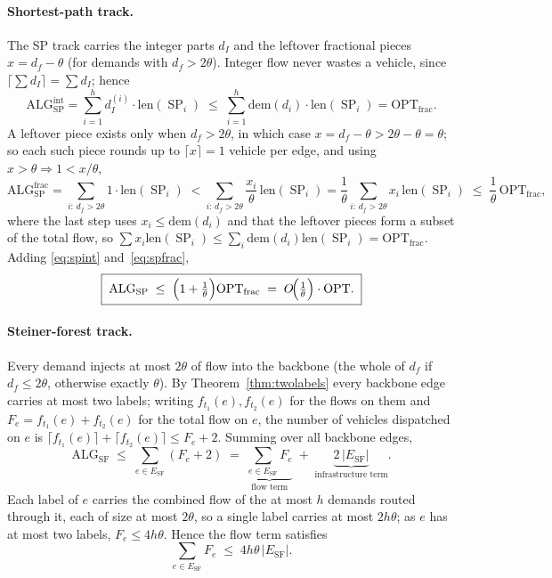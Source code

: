 \documentclass[11pt]{article}
\theoremstyle{definition}
\theoremstyle{remark}
\newcommand{\OPT}{\mathrm{OPT}}
\newcommand{\OPTfrac}{\OPT_{\mathrm{frac}}}
\newcommand{\ALG}{\mathrm{ALG}}
\newcommand{\ALGSP}{\ALG_{\mathrm{SP}}}
\newcommand{\ALGSF}{\ALG_{\mathrm{SF}}}
\newcommand{\ESF}{E_{\mathrm{SF}}}
\newcommand{\dem}{\mathrm{dem}}
\newcommand{\len}{\mathrm{len}}
\DeclareMathOperator{\SP}{SP}
\begin{document}
\paragraph{Shortest-path track.} The SP track carries the integer parts $d_I$ and the leftover
fractional pieces $x=d_f-\theta$ (for demands with $d_f>2\theta$). Integer flow never wastes a
vehicle, since $\lceil\sum d_I\rceil=\sum d_I$; hence
\begin{equation}\label{eq:spint}
  \ALGSP^{\mathrm{int}}=\sum_{i=1}^{h} d_I^{(i)}\cdot\len(\SP_i)
  \;\le\;\sum_{i=1}^{h}\dem(d_i)\cdot\len(\SP_i)=\OPTfrac .
\end{equation}
A leftover piece exists only when $d_f>2\theta$, in which case $x=d_f-\theta>2\theta-\theta=\theta$; so
each such piece rounds up to $\lceil x\rceil=1$ vehicle per edge, and using $x>\theta\Rightarrow1<x/\theta$,
\begin{equation}\label{eq:spfrac}
  \ALGSP^{\mathrm{frac}}
  =\!\!\sum_{i:\,d_f>2\theta}\!\!1\cdot\len(\SP_i)
  \;<\!\!\sum_{i:\,d_f>2\theta}\!\!\frac{x_i}{\theta}\,\len(\SP_i)
  =\frac1\theta\!\!\sum_{i:\,d_f>2\theta}\!\! x_i\,\len(\SP_i)
  \;\le\;\frac1\theta\,\OPTfrac,
\end{equation}
where the last step uses $x_i\le\dem(d_i)$ and that the leftover pieces form a subset of the total
flow, so $\sum x_i\len(\SP_i)\le\sum_i\dem(d_i)\len(\SP_i)=\OPTfrac$. Adding \eqref{eq:spint}
and~\eqref{eq:spfrac},
\begin{equation}\label{eq:sp}
  \boxed{\;\ALGSP \;\le\; \Bigl(1+\tfrac1\theta\Bigr)\OPTfrac \;=\; O\!\Bigl(\tfrac1\theta\Bigr)\cdot\OPT.\;}
\end{equation}

\paragraph{Steiner-forest track.} Every demand injects at most $2\theta$ of flow into the backbone
(the whole of $d_f$ if $d_f\le2\theta$, otherwise exactly $\theta$). By Theorem~\ref{thm:twolabels}
every backbone edge carries at most two labels; writing $f_{t_1}(e),f_{t_2}(e)$ for the flows on them
and $F_e=f_{t_1}(e)+f_{t_2}(e)$ for the total flow on $e$, the number of vehicles dispatched on $e$ is
$\lceil f_{t_1}(e)\rceil+\lceil f_{t_2}(e)\rceil\le F_e+2$. Summing over all backbone edges,
\begin{equation}\label{eq:sfsum}
  \ALGSF \;\le\; \sum_{e\in\ESF}(F_e+2)
  \;=\;\underbrace{\sum_{e\in\ESF}F_e}_{\text{flow term}}\;+\;\underbrace{2\,|\ESF|}_{\text{infrastructure term}}.
\end{equation}
Each label of $e$ carries the combined flow of the at most $h$ demands routed through it, each of size
at most $2\theta$, so a single label carries at most $2h\theta$; as $e$ has at most two labels,
$F_e\le 4h\theta$. Hence the flow term satisfies
\begin{equation}\label{eq:flowterm}
  \sum_{e\in\ESF}F_e\;\le\;4h\theta\,|\ESF| .
\end{equation}
\end{document}
